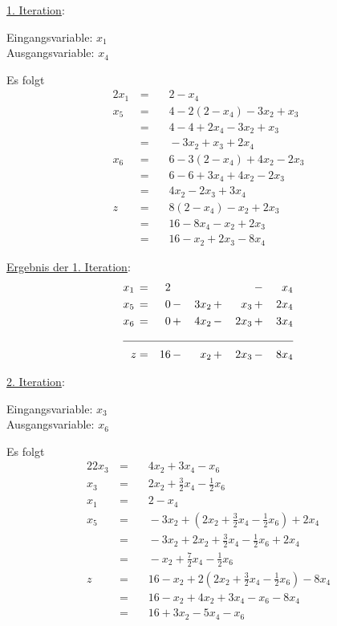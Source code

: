\documentclass[10pt,a4paper,oneside,ngerman,numbers=noenddot]{scrartcl}
\begin{document}
		\underline{1. Iteration}:
		
		Eingangsvariable: $x_{1}$\\
		Ausgangsvariable: $x_{4}$
		
		Es folgt
		\begin{alignat*}{2}
			x_{1} \,&=&&\, 2 - x_{4} \\
			x_{5} \,&=&&\, 4 - 2\left(2 - x_{4}\right) - 3x_{2} + x_{3} \\
			&=&&\, 4 - 4 + 2x_{4} - 3x_{2} + x_{3} \\
			&=&&\, - 3x_{2} + x_{3} + 2x_{4} \\
			x_{6} \,&=&&\, 6 - 3\left(2 - x_{4}\right) + 4x_{2} - 2x_{3} \\
			&=&&\, 6 - 6 + 3x_{4} + 4x_{2} - 2x_{3} \\
			&=&&\, 4x_{2} - 2x_{3} + 3x_{4} \\
			z \,&=&&\, 8\left(2 - x_{4}\right) - x_{2} + 2x_{3} \\
			&=&&\, 16 - 8x_{4} - x_{2} + 2x_{3} \\
			&=&&\, 16 - x_{2} + 2x_{3} - 8x_{4}
		\end{alignat*}
		
		\underline{Ergebnis der 1. Iteration}:
		\begin{alignat*}{5}
			x_{1} \,&=&\, 2 \,&&  && &-&\, x_{4} \\
			x_{5} \,&=&\, 0 \,&-&\, 3x_{2} \,&+&\, x_{3} \,&+&\, 2x_{4} \\
			x_{6} \,&=&\, 0 \,&+&\, 4x_{2} \,&-&\, 2x_{3} \,&+&\, 3x_{4} \\ \cline{1 - 9}
			z &=& 16 \,&-&\, x_{2} \,&+&\, 2x_{3} \,&-&\, 8x_{4}
		\end{alignat*}
		
		\underline{2. Iteration}:
		
		Eingangsvariable: $x_{3}$ \\
		Ausgangsvariable: $x_{6}$
		
		Es folgt
		\begin{alignat*}{2}
			2x_{3} \,&=&&\, 4x_{2} + 3x_{4} - x_{6} \\
			x_{3} \,&=&&\, 2x_{2} + \frac{3}{2}x_{4} - \frac{1}{2}x_{6} \\
			x_{1} \,&=&&\, 2 - x_{4}\\
			x_{5} \,&=&&\, - 3x_{2} + \left(2x_{2} + \frac{3}{2}x_{4} - \frac{1}{2}x_{6}\right) + 2x_{4} \\
			&=&&\, - 3x_{2} + 2x_{2} + \frac{3}{2}x_{4} - \frac{1}{2}x_{6} + 2x_{4} \\
			&=&&\, - x_{2} + \frac{7}{2}x_{4} - \frac{1}{2}x_{6} \\
			z \,&=&&\, 16 - x_{2} + 2\left(2x_{2} + \frac{3}{2}x_{4} - \frac{1}{2}x_{6}\right) - 8x_{4} \\
			&=&&\, 16 - x_{2} + 4x_{2} + 3x_{4} - x_{6} - 8x_{4} \\
			&=&&\, 16 + 3x_{2} - 5x_{4} - x_{6} 
		\end{alignat*}
		
\end{document}
